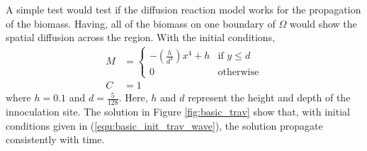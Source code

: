   A simple test would test if the diffusion reaction model works for the propagation of the biomass.
  Having, all of the biomass on one boundary of $\Omega$ would show the spatial diffusion across the region.
  With the initial conditions,
  \begin{equation} \label{equ:basic_init_trav_wave}
    \begin{aligned}
    M &= \begin{cases}
      -\left( \frac{h}{d^4} \right) x^4 + h & \text{if } y \le d \\
      0 & \text{otherwise}
    \end{cases} \\
    C &= 1
    \end{aligned}
  \end{equation}
  where $h = 0.1$ and $d = \frac{5}{128}$.
  Here, $h$ and $d$ represent the height and depth of the innoculation site. 
  The solution in Figure \ref{fig:basic_trav} show that, with initial conditions given in (\ref{equ:basic_init_trav_wave}), the solution propagate consistently with time.
  
